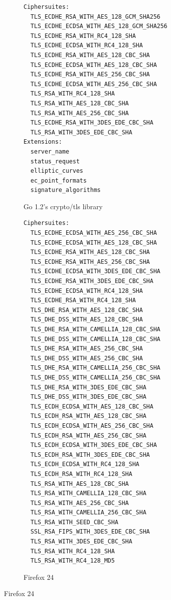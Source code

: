 \documentclass{sig-alternate}
\begin{document}
\begin{figure}
\centering
\begin{subfigure}[t]{0.30\textwidth}
\caption{Go 1.2's crypto/tls library}
\begin{minipage}[t][25.5ex][t]{\textwidth}
\tiny
\begin{verbatim}
Ciphersuites:
  TLS_ECDHE_RSA_WITH_AES_128_GCM_SHA256
  TLS_ECDHE_ECDSA_WITH_AES_128_GCM_SHA256
  TLS_ECDHE_RSA_WITH_RC4_128_SHA
  TLS_ECDHE_ECDSA_WITH_RC4_128_SHA
  TLS_ECDHE_RSA_WITH_AES_128_CBC_SHA
  TLS_ECDHE_ECDSA_WITH_AES_128_CBC_SHA
  TLS_ECDHE_RSA_WITH_AES_256_CBC_SHA
  TLS_ECDHE_ECDSA_WITH_AES_256_CBC_SHA
  TLS_RSA_WITH_RC4_128_SHA
  TLS_RSA_WITH_AES_128_CBC_SHA
  TLS_RSA_WITH_AES_256_CBC_SHA
  TLS_ECDHE_RSA_WITH_3DES_EDE_CBC_SHA
  TLS_RSA_WITH_3DES_EDE_CBC_SHA
Extensions:
  server_name
  status_request
  elliptic_curves
  ec_point_formats
  signature_algorithms
\end{verbatim}
\end{minipage}
\label{fig:ciphersuites:golang}
\end{subfigure}
%
\begin{subfigure}[t]{0.30\textwidth}
\caption{Firefox 24}
\begin{minipage}[t][65ex][t]{\textwidth}
\tiny
\begin{verbatim}
Ciphersuites:
  TLS_ECDHE_ECDSA_WITH_AES_256_CBC_SHA
  TLS_ECDHE_ECDSA_WITH_AES_128_CBC_SHA
  TLS_ECDHE_RSA_WITH_AES_128_CBC_SHA
  TLS_ECDHE_RSA_WITH_AES_256_CBC_SHA
  TLS_ECDHE_ECDSA_WITH_3DES_EDE_CBC_SHA
  TLS_ECDHE_RSA_WITH_3DES_EDE_CBC_SHA
  TLS_ECDHE_ECDSA_WITH_RC4_128_SHA
  TLS_ECDHE_RSA_WITH_RC4_128_SHA
  TLS_DHE_RSA_WITH_AES_128_CBC_SHA
  TLS_DHE_DSS_WITH_AES_128_CBC_SHA
  TLS_DHE_RSA_WITH_CAMELLIA_128_CBC_SHA
  TLS_DHE_DSS_WITH_CAMELLIA_128_CBC_SHA
  TLS_DHE_RSA_WITH_AES_256_CBC_SHA
  TLS_DHE_DSS_WITH_AES_256_CBC_SHA
  TLS_DHE_RSA_WITH_CAMELLIA_256_CBC_SHA
  TLS_DHE_DSS_WITH_CAMELLIA_256_CBC_SHA
  TLS_DHE_RSA_WITH_3DES_EDE_CBC_SHA
  TLS_DHE_DSS_WITH_3DES_EDE_CBC_SHA
  TLS_ECDH_ECDSA_WITH_AES_128_CBC_SHA
  TLS_ECDH_RSA_WITH_AES_128_CBC_SHA
  TLS_ECDH_ECDSA_WITH_AES_256_CBC_SHA
  TLS_ECDH_RSA_WITH_AES_256_CBC_SHA
  TLS_ECDH_ECDSA_WITH_3DES_EDE_CBC_SHA
  TLS_ECDH_RSA_WITH_3DES_EDE_CBC_SHA
  TLS_ECDH_ECDSA_WITH_RC4_128_SHA
  TLS_ECDH_RSA_WITH_RC4_128_SHA
  TLS_RSA_WITH_AES_128_CBC_SHA
  TLS_RSA_WITH_CAMELLIA_128_CBC_SHA
  TLS_RSA_WITH_AES_256_CBC_SHA
  TLS_RSA_WITH_CAMELLIA_256_CBC_SHA
  TLS_RSA_WITH_SEED_CBC_SHA
  SSL_RSA_FIPS_WITH_3DES_EDE_CBC_SHA
  TLS_RSA_WITH_3DES_EDE_CBC_SHA
  TLS_RSA_WITH_RC4_128_SHA
  TLS_RSA_WITH_RC4_128_MD5

\end{verbatim}
\end{minipage}
\end{subfigure}
\end{figure}
\end{document}
